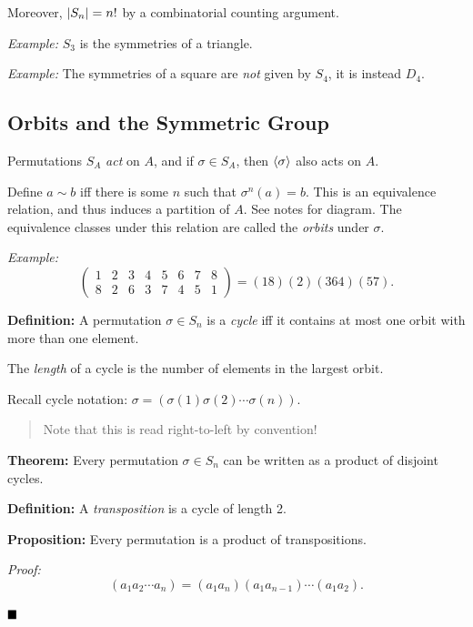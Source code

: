 Moreover, \({\left\lvert {S_{n}} \right\rvert} = n!\) by a combinatorial counting argument.

\emph{Example:} \(S_{3}\) is the symmetries of a triangle.

\emph{Example:} The symmetries of a square are \emph{not} given by
\(S_{4}\), it is instead \(D_{4}\).

\hypertarget{orbits-and-the-symmetric-group}{%
\subsection{Orbits and the Symmetric
Group}\label{orbits-and-the-symmetric-group}}

Permutations \(S_{A}\) \emph{act} on \(A\), and if \(\sigma \in S_{A}\),
then \(\left\langle{\sigma}\right\rangle\) also acts on \(A\).

Define \(a \sim b\) iff there is some \(n\) such that
\(\sigma^{n}(a) = b\). This is an equivalence relation, and thus induces
a partition of \(A\). See notes for diagram. The equivalence classes
under this relation are called the \emph{orbits} under \(\sigma\).

\emph{Example:} \[
\left(\begin{matrix}
1 & 2 & 3 & 4 & 5 & 6 & 7 & 8 \\
8 & 2 & 6 & 3 & 7 & 4 & 5 & 1
\end{matrix}\right) = (1 8)(2)(3 6 4)(5 7).
\]

\textbf{Definition:} A permutation \(\sigma \in S_{n}\) is a
\emph{cycle} iff it contains at most one orbit with more than one
element.

The \emph{length} of a cycle is the number of elements in the largest
orbit.

Recall cycle notation:
\(\sigma = (\sigma(1) \sigma(2) \cdots \sigma(n))\).

\begin{quote}
Note that this is read right-to-left by convention!
\end{quote}

\textbf{Theorem:} Every permutation \(\sigma \in S_{n}\) can be written
as a product of disjoint cycles.

\textbf{Definition:} A \emph{transposition} is a cycle of length 2.

\textbf{Proposition:} Every permutation is a product of transpositions.

\emph{Proof:} \[
(a_{1} a_{2} \cdots a_{n}) = (a_{1} a_{n}) (a_{1} a_{n-1}) \cdots (a_{1} a_{2})
.\]

\(\qed\)

